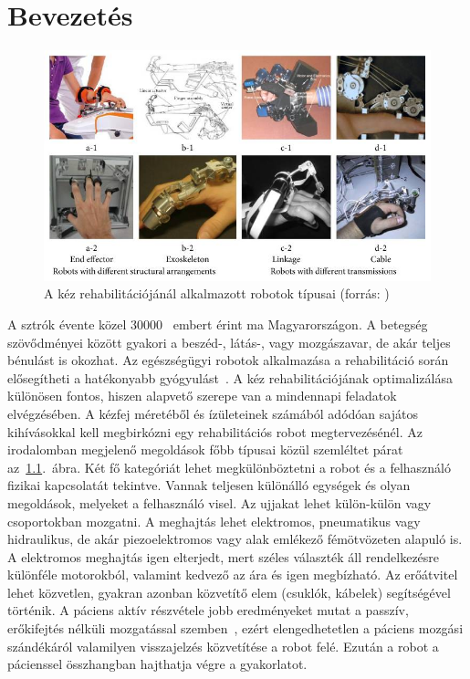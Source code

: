 \chapter{Bevezetés}

\begin{figure}[b!]
	\begin{center}
		\includegraphics[width=12cm]{images/hand_rehab_robot_types.jpeg}
		\caption[A kéz rehabilitációjánál alkalmazott robotok típusai ]{A kéz rehabilitációjánál alkalmazott robotok típusai (forrás: \cite{Yue2017})}\label{fig:hand_rehab_robot_types}
	\end{center}
\end{figure}

A sztrók évente közel 30\hspace{1.5pt}000~\citep{Bereczki2023} embert érint ma Magyarországon. A betegség szövődményei között gyakori 
a beszéd-, látás-, vagy mozgászavar, de akár teljes bénulást is okozhat. Az egészségügyi robotok alkalmazása a 
rehabilitáció során elősegítheti a hatékonyabb gyógyulást~\citep{Chang2013}. A kéz rehabilitációjának optimalizálása 
különösen fontos, hiszen alapvető szerepe van a mindennapi feladatok elvégzésében. A kézfej méretéből és ízületeinek számából 
adódóan sajátos kihívásokkal kell megbirkózni egy rehabilitációs robot megtervezésénél.
Az irodalomban megjelenő megoldások főbb típusai közül szemléltet párat az~\ref{fig:hand_rehab_robot_types}.~ábra.
Két fő kategóriát lehet megkülönböztetni a robot és a felhasználó fizikai kapcsolatát tekintve. Vannak teljesen 
különálló egységek és olyan megoldások, melyeket a felhasználó visel. Az ujjakat lehet külön-külön vagy 
csoportokban mozgatni. A meghajtás lehet elektromos, pneumatikus vagy hidraulikus, de akár piezoelektromos vagy 
alak emlékező fémötvözeten alapuló is. A elektromos meghajtás igen elterjedt, mert széles választék áll rendelkezésre különféle motorokból, 
valamint kedvező az ára és igen megbízható. Az erőátvitel lehet közvetlen, gyakran azonban közvetítő elem (csuklók, kábelek) 
segítségével történik. A páciens aktív részvétele jobb eredményeket mutat a passzív, erőkifejtés nélküli mozgatással 
szemben~\citep{Remsik2016}, ezért elengedhetetlen a páciens mozgási szándékáról valamilyen visszajelzés közvetítése a robot felé.
Ezután a robot a pácienssel összhangban hajthatja végre a gyakorlatot.

